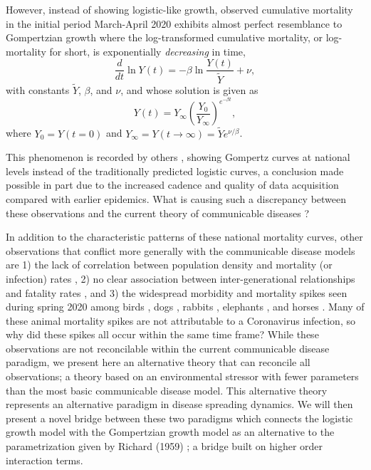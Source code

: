 \documentclass{article}
\newcommand{\insertSmallPdfFig}[3]{
  \begin{figure}[h]
  \centering
  \texttt{[image: \#1.pdf]}
  \caption{#2}
  \label{fig:#1}
  \end{figure}
}
\begin{document}
However, instead of showing logistic-like growth, observed cumulative mortality in the initial period March-April 2020 exhibits almost perfect resemblance to Gompertzian growth \cite{Gompertz1825,bajzer1997mathematical} where the log-transformed cumulative mortality, or log-mortality for short, is exponentially \emph{decreasing} in time,
\begin{equation}
\label{eq:GompertzODE}
\frac{d}{dt}\ln{Y(t)} = -\beta\ln{\frac{Y(t)}{\tilde{Y}}} + \nu,
\end{equation} 
with constants $\tilde{Y}$, $\beta$, and $\nu$, and whose solution is given as
\begin{equation}
\label{eq:gomp_solution}
Y(t) = Y_\infty \left(\frac{Y_0}{Y_\infty}\right)^{e^{-\beta t}},
\end{equation}
where $Y_{0}=Y(t = 0)$ and $Y_{\infty}=Y(t\rightarrow \infty)=\tilde{Y}e^{\nu/\beta}$.


This phenomenon is recorded by others \cite{Ohnishi2020,Rypdal2020,Catala2020,rodrigues2020monte,Levitt2020}, showing Gompertz curves at national levels instead of the traditionally predicted logistic curves, a conclusion made possible in part due to the increased cadence and quality of data acquisition compared with earlier epidemics. What is causing such a discrepancy between these observations and the current theory of communicable diseases \cite{castro2020turning}? 

In addition to the characteristic patterns of these national mortality curves, other observations that conflict more generally with the communicable disease models are 1) the lack of correlation between population density and mortality (or infection) rates \cite{Hamidi2020,Hamidi2020a,Carozzi2020,khavarian2021high,barak2021urban}, 2) no clear association between inter-generational relationships and fatality rates \cite{Arpino2020}, and 3) the widespread morbidity and mortality spikes seen during spring 2020 among birds \cite{Fischer2021}, dogs \cite{PeriseBarrios2021}, rabbits \cite{Duff2020,Hu2020,Fukui2021}, elephants \cite{Aarde2021}, and horses \cite{Kambayashi2021,King2020,Lu2020,CastilloOlivares2020}. Many of these animal mortality spikes are not attributable to a Coronavirus infection, so why did these spikes all occur within the same time frame? While these observations are not reconcilable within the current communicable disease paradigm, we present here an alternative theory that can reconcile all observations; a theory based on an environmental stressor with fewer parameters than the most basic communicable disease model. This alternative theory represents an alternative paradigm in disease spreading dynamics. We will then present a novel bridge between these two paradigms which connects the logistic growth model with the Gompertzian growth model as an alternative to the parametrization given by Richard (1959) \cite{richards1959flexible}; a bridge built on higher order interaction terms. 
\end{document}
